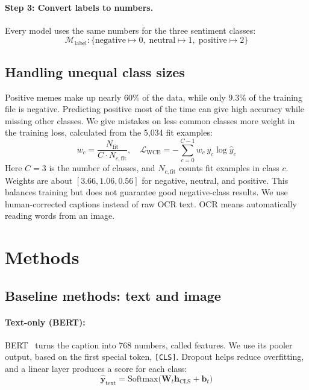 \documentclass[11pt,a4paper]{article}
\begin{document}
\paragraph{Step 3: Convert labels to numbers.}
Every model uses the same numbers for the three sentiment classes:
\begin{equation}
    \mathcal{M}_{\text{label}} : \{\text{negative} \mapsto 0,\; \text{neutral} \mapsto 1,\; \text{positive} \mapsto 2\}
\end{equation}

\subsection{Handling unequal class sizes}
\label{subsec:imbalance}
Positive memes make up nearly 60\% of the data, while only 9.3\% of the training file is negative. Predicting positive most of the time can give high accuracy while missing other classes. We give mistakes on less common classes more weight in the training loss, calculated from the 5{,}034 fit examples:
\begin{equation}
    w_c = \frac{N_{\text{fit}}}{C \cdot N_{c,\text{fit}}}, \quad \mathcal{L}_{\text{WCE}} = -\sum_{c=0}^{C-1} w_c \, y_c \log \hat{y}_c
\end{equation}
Here $C=3$ is the number of classes, and $N_{c,\text{fit}}$ counts fit examples in class $c$. Weights are about $[3.66,1.06,0.56]$ for negative, neutral, and positive. This balances training but does not guarantee good negative-class results. We use human-corrected captions instead of raw OCR text. OCR means automatically reading words from an image.

\section{Methods}
\label{sec:methods}

\subsection{Baseline methods: text and image}
\paragraph{Text-only (BERT):} BERT~\cite{devlin2019bert} turns the caption into 768 numbers, called features. We use its pooler output, based on the first special token, \texttt{[CLS]}. Dropout helps reduce overfitting, and a linear layer produces a score for each class:
\begin{equation}
    \hat{\mathbf{y}}_{\text{text}} = \mathrm{Softmax}\big( \mathbf{W}_t \mathbf{h}_{\text{CLS}} + \mathbf{b}_t \big)
\end{equation}
\end{document}
